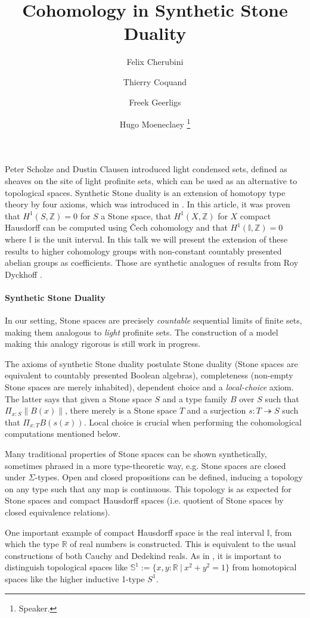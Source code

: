 \documentclass[letterpaper]{../util/easychair}
\title{Cohomology in Synthetic Stone Duality 
}
\author{
Felix Cherubini %
\and 
 Thierry Coquand%
\and 
 Freek Geerligs%
\and
 Hugo Moeneclaey %
\thanks{Speaker.}%
}
\institute{
  University of Gothenburg and Chalmers University of Technology, Gothenburg, Sweden%
}
\newcommand{\R}{\mathbb{R}}
\newcommand{\Z}{\mathbb{Z}}
\newcommand{\I}{\mathbb{I}}
\newcommand{\bS}{\mathbb{S}}
\begin{document}
\maketitle
Peter Scholze and Dustin Clausen \cite{Scholze} introduced light condensed sets, defined as sheaves on the site of light profinite sets, which can be used as an alternative to topological spaces. 
Synthetic Stone duality is an extension of homotopy type theory by four axioms, which was introduced in \cite{synthetic-stone-duality}. In this article, it was proven that $H^1(S,\Z) = 0$ for $S$ a Stone space, that $H^1(X,\Z)$ for $X$ compact Hausdorff can be computed using \v{C}ech cohomology and that $H^1(\mathbb{I},\Z) = 0$ where $\mathbb{I}$ is the unit interval. In this talk we will present the extension of these results to higher cohomology groups with non-constant countably presented abelian groups as coefficients. Those are synthetic analogues of results from Roy Dyckhoff \cite{dyckhoff76,dyckhoff76-1}.

\paragraph*{Synthetic Stone Duality}

In our setting, Stone spaces are precisely \emph{countable} sequential limits of finite sets, making them analogous to \emph{light} profinite sets. The construction of a model making this analogy rigorous is still work in progress.

The axioms of synthetic Stone duality postulate Stone duality (Stone spaces are equivalent to countably presented Boolean algebras), completeness (non-empty Stone spaces are merely inhabited), dependent choice and a \emph{local-choice} axiom. The latter says that given a Stone space $S$ and a type family $B$ over $S$ such that $\Pi_{x:S} \| B(x)  \|$, there merely is a Stone space $T$ and a surjection $s:T\twoheadrightarrow S$ such that $\Pi_{x:T} B(s(x))$. Local choice is crucial when performing the cohomological computations mentioned below.

Many traditional properties of Stone spaces can be shown synthetically, sometimes phrased in a more type-theoretic way, e.g. Stone spaces are closed under $\Sigma$-types. Open and closed propositions can be defined, inducing a topology on any type such that any map is continuous. This topology is as expected for Stone spaces and compact Hausdorff spaces (i.e. quotient of Stone spaces by closed equivalence relations).

One important example of compact Hausdorff space is the real interval $\I$, from which the type $\R$ of real numbers is constructed. This is equivalent to the usual constructions of both Cauchy and Dedekind reals.
As in \cite{shulman-Brouwer-fixed-point}, it is important to distinguish topological spaces like $\bS^1:=\{x,y:\R\ \vert\ x^2+y^2=1\}$ from homotopical spaces like the higher inductive 1-type $S^1$.
\end{document}
